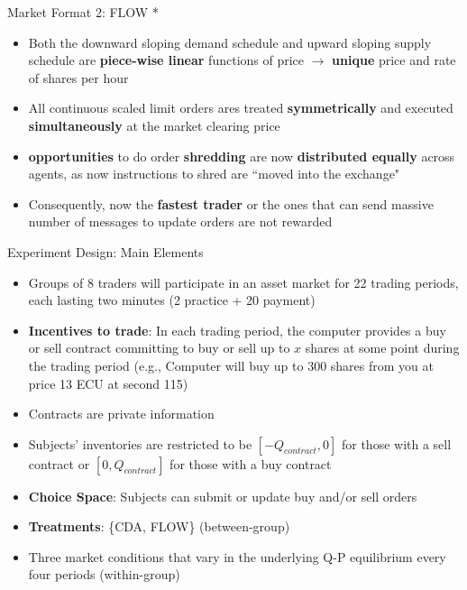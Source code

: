 \documentclass[10pt]{beamer}
\begin{document}
\begin{frame}{Market Format 2: FLOW}
*
    \begin{itemize}
        \item Both the downward sloping demand schedule and upward sloping supply schedule are \textbf{piece-wise linear} functions of price $\rightarrow$ \textbf{unique} price and rate of shares per hour
        \item All continuous scaled limit orders ares treated \textbf{symmetrically} and executed \textbf{simultaneously} at the market clearing price
        \item \textbf{opportunities} to do order \textbf{shredding} are now \textbf{distributed equally} across agents, as now instructions to shred are ``moved into the exchange"
        \item Consequently, now the \textbf{fastest trader} or the ones that can send massive number of messages to update orders are not rewarded
    \end{itemize}
\end{frame}

\begin{frame}{Experiment Design: Main Elements}
    \begin{itemize}
        \item Groups of 8 traders will participate in an asset market for 22 trading periods, each lasting two minutes (2 practice + 20 payment)
        \item \textbf{Incentives to trade}: In each trading period, the computer provides a buy or sell contract committing to buy or sell up to $x$ shares at some point during the trading period (e.g., Computer will buy up to 300 shares from you at price 13 ECU at second 115)
        \item Contracts are private information
        \item Subjects' inventories are restricted to be $[-Q_{contract}, 0]$ for those with a sell contract or $[0, Q_{contract}]$ for those with a buy contract
        \item \textbf{Choice Space}: Subjects can submit or update buy and/or sell orders
        \item \textbf{Treatments}: \{CDA, FLOW\} (between-group)
        \item Three market conditions that vary in the underlying Q-P equilibrium every four periods (within-group)
    \end{itemize}
\end{frame}
\end{document}
